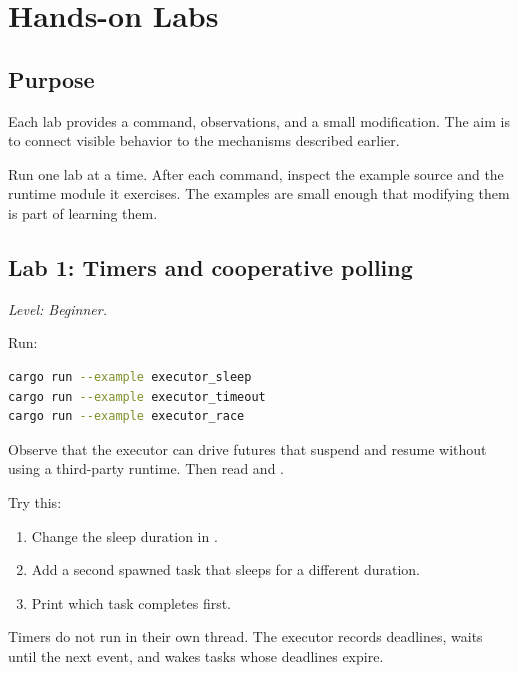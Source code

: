 \chapter{Hands-on Labs}
\label{chap:labs}

\section{Purpose}

Each lab provides a command, observations, and a small modification. The aim is
to connect visible behavior to the mechanisms described earlier.

\begin{notabene}
Run one lab at a time. After each command, inspect the example source and the
runtime module it exercises. The examples are small enough that modifying them
is part of learning them.
\end{notabene}

\section{Lab 1: Timers and cooperative polling}

\textit{Level: Beginner.}

Run:

\begin{lstlisting}[language=bash,caption={Timer examples}]
cargo run --example executor_sleep
cargo run --example executor_timeout
cargo run --example executor_race
\end{lstlisting}

Observe that the executor can drive futures that suspend and resume without
using a third-party runtime. Then read
 and
.

Try this:

\begin{enumerate}
    \item Change the sleep duration in .
    \item Add a second spawned task that sleeps for a different duration.
    \item Print which task completes first.
\end{enumerate}

Timers do not run in their own thread. The executor records
deadlines, waits until the next event, and wakes tasks whose deadlines expire.

